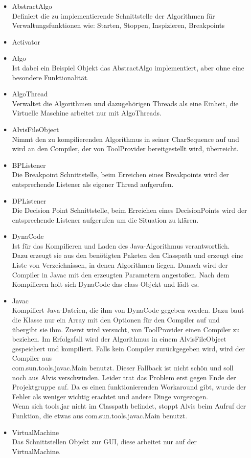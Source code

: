 \documentclass[10pt,a4paper,oneside]{scrbook}
\begin{document}
\begin{itemize}
 \item AbstractAlgo\\
	Definiert die zu implementierende Schnittstelle der Algorithmen für Verwaltungsfunktionen wie: Starten, Stoppen, Inspizieren, Breakpoints
 \item Activator\\
 \item Algo\\
	Ist dabei ein Beispiel Objekt das AbstractAlgo implementiert, aber ohne eine besondere Funktionalität.
 \item AlgoThread\\
	Verwaltet die Algorithmen und dazugehörigen Threads als eine Einheit, die Virtuelle Maschine arbeitet nur mit AlgoThreads.
 \item AlvisFileObject\\
    Nimmt den zu kompilierenden Algorithmus in seiner CharSequence auf und wird an den Compiler, der von ToolProvider
    bereitgestellt wird, überreicht.
 \item BPListener\\
	Die Breakpoint Schnittstelle, beim Erreichen eines Breakpoints wird der entsprechende Listener als eigener Thread aufgerufen.
 \item DPListener\\
	Die Decision Point Schnittstelle, beim Erreichen eines DecisionPoints wird der entsprechende Listener aufgerufen um die Situation zu klären.
 \item DynaCode\\
    Ist für das Kompilieren und Laden des Java-Algorithmus verantwortlich.
    Dazu erzeugt sie aus den benötigten Paketen den Classpath und erzeugt eine Liste von Verzeichnissen, in denen
    Algorithmen liegen. Danach wird der Compiler in Javac mit den erzeugten Parametern angestoßen. Nach dem Kompilieren
    holt sich DynaCode das class-Objekt und lädt es.
 \item Javac\\
    Kompiliert Java-Dateien, die ihm von DynaCode gegeben werden. Dazu baut die Klasse nur ein Array mit den
    Optionen für den Compiler auf und übergibt sie ihm. Zuerst wird versucht, von ToolProvider einen Compiler zu
    beziehen. Im Erfolgsfall wird der Algorithmus in einem AlvisFileObject gespeichert und kompiliert.
    Falls kein Compiler zurückgegeben wird, wird der Compiler aus\\com.\-sun.\-tools.\-javac.\-Main benutzt.
    Dieser Fallback ist nicht schön und soll noch aus Alvis verschwinden. Leider trat das Problem erst gegen Ende der
    Projektgruppe auf. Da es einen funktionierenden Workaround gibt, wurde der Fehler als weniger wichtig erachtet und
    andere Dinge vorgezogen.\\
    Wenn sich tools.jar nicht im Classpath befindet, stoppt Alvis beim Aufruf der Funktion, die etwas
    aus com.\-sun.\-tools.\-javac.\-Main benutzt.
 \item VirtualMachine \\
	Das Schnittstellen Objekt zur GUI, diese arbeitet nur auf der VirtualMachine.
\end{itemize}
\end{document}
